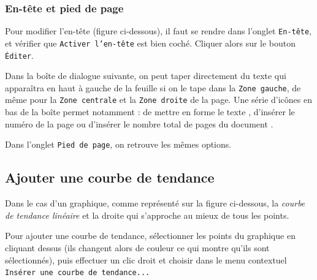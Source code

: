


\subsubsection{En-tête et pied de page}

Pour modifier l'en-tête (figure ci-dessous), il faut se rendre dans l'onglet \texttt{En-tête}, et vérifier que \texttt{Activer l'en-tête} est bien coché. Cliquer alors sur le bouton \texttt{Éditer}.   


Dans la boîte de dialogue suivante, on peut taper directement du texte qui apparaîtra en haut à gauche de la feuille si on le tape dans la \texttt{Zone gauche}, de même pour la \texttt{Zone centrale} et la \texttt{Zone droite} de la page. Une série d'icônes en bas de la boîte permet notamment : de mettre en forme le texte , d'insérer le numéro de la page  ou d'insérer le nombre total de pages du document .  


Dans l'onglet \texttt{Pied de page}, on retrouve les mêmes options. 





\subsection{Ajouter une courbe de tendance}\label{Calc2CourbeTendance} 

Dans le cas d'un graphique, comme représenté sur la figure ci-dessous, la \emph{courbe de tendance linéaire} et la droite qui s'approche au mieux de tous les points. 



Pour ajouter une courbe de tendance, sélectionner les points du graphique en cliquant dessus (ils changent alors de couleur ce qui montre qu'ils sont sélectionnés), puis effectuer un clic droit et choisir dans le menu contextuel \texttt{Insérer une courbe de tendance...}

%

